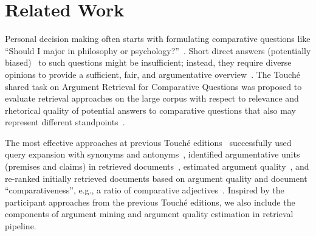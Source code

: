 \section{Related Work}

Personal decision making often starts with formulating comparative questions like ``Should I major in philosophy or psychology?''~\cite{BondarenkoFBGAPBSWPH2020,BondarenkoGFBAPBSWPH2021,BondarenkoFKSGBPBSWPH2022}. Short direct answers (potentially biased)~\cite{PotthastHS2020} to such questions might be insufficient; instead, they require diverse opinions to provide a sufficient, fair, and argumentative overview~\cite{BondarenkoFBGAPBSWPH2020}.
The Touch{\'e} shared task on Argument Retrieval for Comparative Questions was proposed to evaluate retrieval approaches on the large corpus with respect to relevance and rhetorical quality of potential answers to comparative questions that also may represent different standpoints~\cite{BondarenkoADHBH22}.

The most effective approaches at previous Touch{\'e} editions~\cite{BondarenkoFBGAPBSWPH2020,BondarenkoGFBAPBSWPH2021} successfully used query expansion with synonyms and antonyms~\cite{AbyeST2020}, identified argumentative units (premises and claims) in retrieved documents~\cite{Huck2020, ShirshakovaW2021}, estimated argument quality~\cite{AbyeST2020}, and re-ranked initially retrieved documents based on argument quality and document ``comparativeness'', e.g., a ratio of comparative adjectives~\cite{ChekalinaP2021}. Inspired by the participant approaches from the previous Touch{\'e} editions, we also include the components of argument mining and argument quality estimation in retrieval pipeline.


